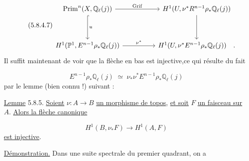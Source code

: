 \begin{equation}\tag{5.8.4.7}
\begin{tikzcd}[column sep=huge, row sep=huge]
\mathrm{Prim}^n(X,\mathbb{Q}_\ell(j)) \arrow[r, "\mathrm{Grif}"] \arrow[d, hook, "u"] & H^1(U,\nu^*R^{n-1}\rho_*\mathbb{Q}_\ell(j)) \arrow[d] \\
H^1(\mathbb{P}^1,E^{n-1}\rho_*\mathbb{Q}_\ell(j)) \arrow[r, "\nu^*"] & H^1(U,\nu^*E^{n-1}\rho_*\mathbb{Q}_\ell(j)) \quad .
\end{tikzcd}
\end{equation}
Il suffit maintenant de voir que la flèche en bas est injective,ce qui résulte du fait

\begin{equation}\tag{5.8.4.8}
E^{n-1}\rho_*\mathbb{Q}_\ell(j) \;\simeq\; \nu_*\nu^*E^{n-1}\rho_*\mathbb{Q}_\ell(j)
\end{equation}
par le lemme (bien connu !) suivant :

\underline{Lemme} 5.8.5. \underline{Soient} $\nu : A \longrightarrow B$ \underline{un morphisme de topos}, \underline{et soit} $F$ \underline{un faisceau sur} $A$. \underline{Alors la flèche canonique}

\begin{equation}\tag{5.8.5.1}
H^1(B,\nu_*F) \longrightarrow H^1(A,F)
\end{equation}
\underline{est injective}.

\underline{Démonstration.} Dans une suite spectrale du premier quadrant, on a

